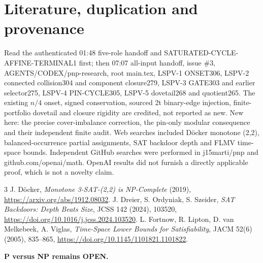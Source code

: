 \documentclass[11pt]{article}
\begin{document}
\section{Literature, duplication and provenance}
Read the authenticated 01:48 five-role handoff and SATURATED-CYCLE-AFFINE-TERMINAL1 first; then 07:07 all-input handoff, issue \#3, AGENTS/CODEX/pnp-research, root main.tex, LSPV-1 ONSET306, LSPV-2 connected collision304 and component closure279, LSPV-3 GATE303 and earlier selector275, LSPV-4 PIN-CYCLE305, LSPV-5 dovetail268 and quotient265. The existing $n/4$ onset, signed conservation, sourced 2t binary-edge injection, finite-portfolio dovetail and closure rigidity are credited, not reported as new. New here: the precise cover-imbalance correction, the pin-only modular consequence and their independent finite audit. Web searches included D\"ocker monotone (2,2), balanced-occurrence partial assignments, SAT backdoor depth and FLMV time-space bounds. Independent GitHub searches were performed in j15marti/pnp and github.com/openai/math. OpenAI results did not furnish a directly applicable proof, which is not a novelty claim.

\begin{thebibliography}{3}
 J. D\"ocker, \emph{Monotone 3-SAT-(2,2) is NP-Complete} (2019), \url{https://arxiv.org/abs/1912.08032}.
 J. Dreier, S. Ordyniak, S. Szeider, \emph{SAT Backdoors: Depth Beats Size}, JCSS 142 (2024), 103520, \url{https://doi.org/10.1016/j.jcss.2024.103520}.
 L. Fortnow, R. Lipton, D. van Melkebeek, A. Viglas, \emph{Time-Space Lower Bounds for Satisfiability}, JACM 52(6) (2005), 835--865, \url{https://doi.org/10.1145/1101821.1101822}.
\end{thebibliography}
\noindent\textbf{P versus NP remains OPEN.}
\end{document}
